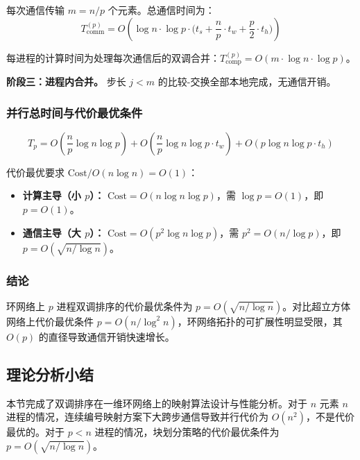 \documentclass[UTF8,a4paper,10pt]{ctexart}
\begin{document}
每次通信传输 $m = n/p$ 个元素。总通信时间为：
\begin{equation}
T_{\text{comm}}^{(p)} = O\!\left(\log n \cdot \log p \cdot \bigl(t_s + \frac{n}{p} \cdot t_w + \frac{p}{2} \cdot t_h\bigr)\right)
\end{equation}

每进程的计算时间为处理每次通信后的双调合并：$T_{\text{comp}}^{(p)} = O(m \cdot \log n \cdot \log p)$。

\textbf{阶段三：进程内合并。} 步长 $j < m$ 的比较-交换全部本地完成，无通信开销。

\subsubsection{并行总时间与代价最优条件}

\begin{equation}
T_p = O\!\left(\frac{n}{p} \log n \log p\right) + O\!\left(\frac{n}{p} \log n \log p \cdot t_w\right) + O\!\left(p \log n \log p \cdot t_h\right)
\end{equation}

代价最优要求 $\text{Cost} / O(n \log n) = O(1)$：

\begin{itemize}
    \item \textbf{计算主导（小 $p$）：} $\text{Cost} = O(n \log n \log p)$，需 $\log p = O(1)$，即 $p = O(1)$。
    \item \textbf{通信主导（大 $p$）：} $\text{Cost} = O(p^2 \log n \log p)$，需 $p^2 = O(n / \log p)$，即 $p = O(\sqrt{n / \log n})$。
\end{itemize}

\subsubsection{结论}

环网络上 $p$ 进程双调排序的代价最优条件为 $p = O(\sqrt{n / \log n})$。对比超立方体网络上代价最优条件 $p = O(n / \log^2 n)$，环网络拓扑的可扩展性明显受限，其 $O(p)$ 的直径导致通信开销快速增长。

\subsection{理论分析小结}

本节完成了双调排序在一维环网络上的映射算法设计与性能分析。对于 $n$ 元素 $n$ 进程的情况，连续编号映射方案下大跨步通信导致并行代价为 $O(n^2)$，不是代价最优的。对于 $p < n$ 进程的情况，块划分策略的代价最优条件为 $p = O(\sqrt{n / \log n})$。
\end{document}
